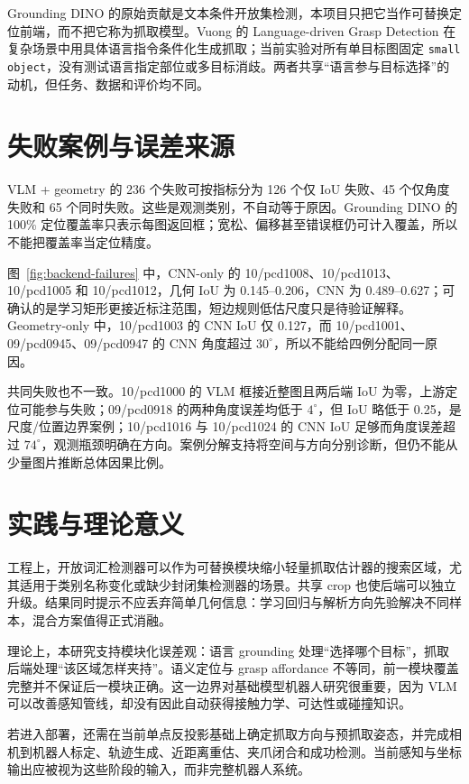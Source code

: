 \documentclass{l4proj}
\begin{document}
Grounding DINO 的原始贡献是文本条件开放集检测\citep{liu2023grounding}，本项目只把它当作可替换定位前端，而不把它称为抓取模型。Vuong 的 Language-driven Grasp Detection 在复杂场景中用具体语言指令条件化生成抓取\citep{vuong2024language}；当前实验对所有单目标图固定 \texttt{small object}，没有测试语言指定部位或多目标消歧。两者共享“语言参与目标选择”的动机，但任务、数据和评价均不同。

\section{失败案例与误差来源}
VLM + geometry 的 236 个失败可按指标分为 126 个仅 IoU 失败、45 个仅角度失败和 65 个同时失败。这些是观测类别，不自动等于原因。Grounding DINO 的 100\% 定位覆盖率只表示每图返回框；宽松、偏移甚至错误框仍可计入覆盖，所以不能把覆盖率当定位精度。

图~\ref{fig:backend-failures} 中，CNN-only 的 10/pcd1008、10/pcd1013、10/pcd1005 和 10/pcd1012，几何 IoU 为 0.145--0.206，CNN 为 0.489--0.627；可确认的是学习矩形更接近标注范围，短边规则低估尺度只是待验证解释。Geometry-only 中，10/pcd1003 的 CNN IoU 仅 0.127，而 10/pcd1001、09/pcd0945、09/pcd0947 的 CNN 角度超过 $30^\circ$，所以不能给四例分配同一原因。

共同失败也不一致。10/pcd1000 的 VLM 框接近整图且两后端 IoU 为零，上游定位可能参与失败；09/pcd0918 的两种角度误差均低于 $4^\circ$，但 IoU 略低于 0.25，是尺度/位置边界案例；10/pcd1016 与 10/pcd1024 的 CNN IoU 足够而角度误差超过 $74^\circ$，观测瓶颈明确在方向。案例分解支持将空间与方向分别诊断，但仍不能从少量图片推断总体因果比例。

\section{实践与理论意义}
工程上，开放词汇检测器可以作为可替换模块缩小轻量抓取估计器的搜索区域，尤其适用于类别名称变化或缺少封闭集检测器的场景。共享 crop 也使后端可以独立升级。结果同时提示不应丢弃简单几何信息：学习回归与解析方向先验解决不同样本，混合方案值得正式消融。

理论上，本研究支持模块化误差观：语言 grounding 处理“选择哪个目标”，抓取后端处理“该区域怎样夹持”。语义定位与 grasp affordance 不等同，前一模块覆盖完整并不保证后一模块正确。这一边界对基础模型机器人研究很重要，因为 VLM 可以改善感知管线，却没有因此自动获得接触力学、可达性或碰撞知识。

若进入部署，还需在当前单点反投影基础上确定抓取方向与预抓取姿态，并完成相机到机器人标定、轨迹生成、近距离重估、夹爪闭合和成功检测。当前感知与坐标输出应被视为这些阶段的输入，而非完整机器人系统。
\end{document}
